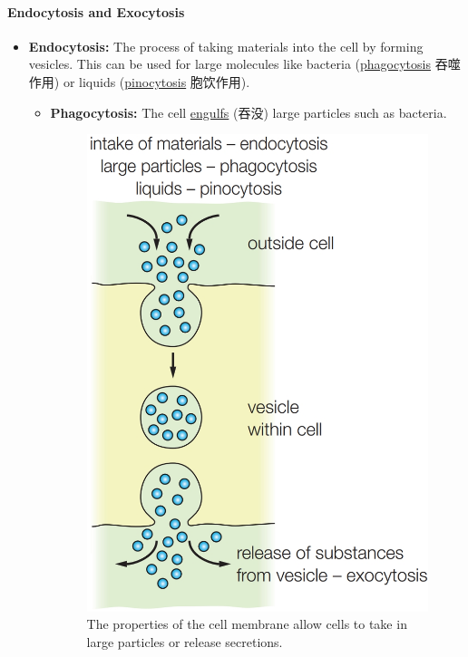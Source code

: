 \paragraph{Endocytosis and Exocytosis}
\begin{itemize}
    \item \textbf{Endocytosis:} The process of taking materials into the cell by forming vesicles. This can be used for large
    molecules like bacteria (\underline{phagocytosis} 吞噬作用) or liquids (\underline{pinocytosis} 胞饮作用).
    \begin{itemize}
        \item \textbf{Phagocytosis:} The cell \underline{engulfs} (吞没) large particles such as bacteria.
        \begin{figure}[H]
            \centering
            \includegraphics[scale=0.2]{Biology/2A/Images/2A-4-2.png}
            \caption{The properties of the cell membrane allow cells to take in large particles or release secretions.}

\end{figure}
\end{itemize}
\end{itemize}
